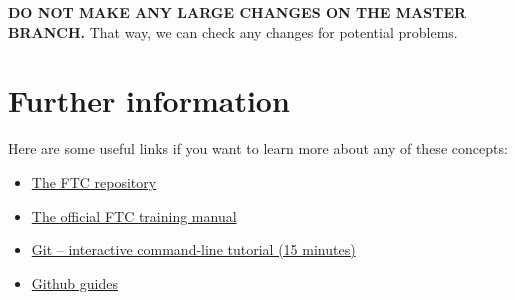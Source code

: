\documentclass[12p,a4paper]{article}
\begin{document}
\textbf{DO NOT MAKE ANY LARGE CHANGES ON THE MASTER BRANCH.} That way, we can check any changes for potential problems.

\section{Further information}

Here are some useful links if you want to learn more about any of these concepts:

\begin{itemize}
\item{\href{https://github.com/ftctechnh/ftc_app}{The FTC repository}}
\item{\href{https://github.com/ftctechnh/ftc_app/blob/master/doc/tutorial/FTCTraining_Manual.pdf}{The official FTC training manual}}
\item{\href{https://try.github.io/}{Git -- interactive command-line tutorial (15 minutes)}}
\item{\href{https://guides.github.com}{Github guides}}
\end{itemize}
\end{document}
